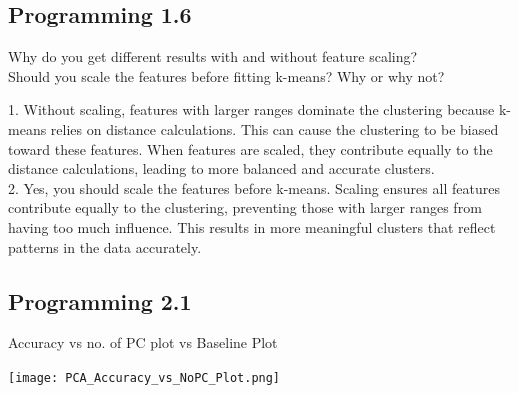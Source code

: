 \documentclass[12pt]{article}
\begin{document}
\subsection{Programming 1.6}
\begin{tcolorbox}
Why do you get different results with and without feature scaling?\\
Should you scale the features before fitting k-means? Why or why not?

\end{tcolorbox}
\begin{tcolorbox}[title = Answer, myblock]
1. Without scaling, features with larger ranges dominate the clustering because k-means relies on distance calculations. This can cause the clustering to be biased toward these features. When features are scaled, they contribute equally to the distance calculations, leading to more balanced and accurate clusters.\\
2. Yes, you should scale the features before k-means. Scaling ensures all features contribute equally to the clustering, preventing those with larger ranges from having too much influence. This results in more meaningful clusters that reflect patterns in the data accurately.
\end{tcolorbox}

\subsection{Programming 2.1}
Accuracy vs no. of PC plot vs Baseline Plot
\begin{center}
  \texttt{[image: PCA\_Accuracy\_vs\_NoPC\_Plot.png]}
\end{center}
\end{document}
